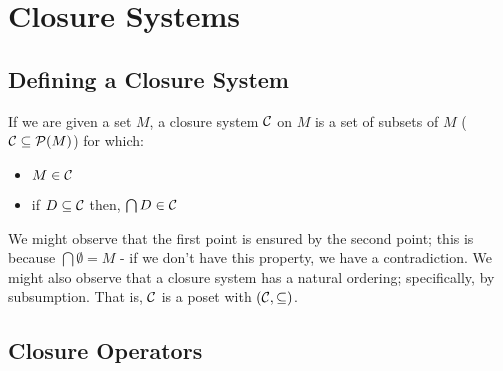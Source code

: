 \section{Closure Systems}
\label{sec:Closure_Systems}

\subsection{Defining a Closure System}
\label{subsec:Closure_Systems-Defining_a_Closure_System}

If we are given a set $M$, a closure system $\mathcal{C}$ on $M$ is a set of subsets of $M$ ($\mathcal{C} \subseteq \mathcal{P}(M)$) for which: 

\begin{itemize}
    \item $M \in \mathcal{C}$
    \item if $D\subseteq \mathcal{C}$ then, $\bigcap D \in \mathcal{C}$
\end{itemize}

We might observe that the first point is ensured by the second point; this is because $\bigcap \emptyset = M$ - if we don't have this property, we have a contradiction. We might also observe that a closure system has a natural ordering; specifically, by subsumption. That is, $\mathcal{C}$ is a poset with $(\mathcal{C}, \subseteq)$. 

\subsection{Closure Operators}
\label{subsec:Closure_Systems-Closure_Operators}
